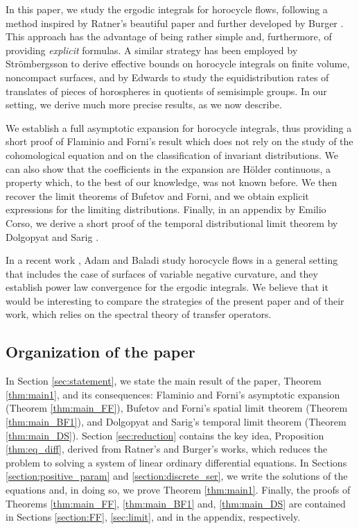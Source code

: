 \documentclass[10pt]{amsart}
\theoremstyle{definition}
\begin{document}
In this paper, we study the ergodic integrals for horocycle flows, following a method inspired by Ratner's beautiful paper \cite{Rat1} and further developed by Burger \cite{Bur}. This approach has the advantage of being rather simple and, furthermore, of providing \emph{explicit} formulas. A similar strategy has been employed by Strömbergsson \cite{Str} to derive effective bounds on horocycle integrals on finite volume, noncompact surfaces, and by Edwards \cite{Edw} to study the equidistribution rates of translates of pieces of horospheres in quotients of semisimple groups. In our setting, we derive much more precise results, as we now describe.\enlargethispage{\baselineskip}

We establish a full asymptotic expansion for horocycle integrals, thus providing a short proof of Flaminio and Forni's result which does not rely on the study of the cohomological equation and on the classification of invariant distributions.
We can also show that the coefficients in the expansion are Hölder continuous, a property which, to the best of our knowledge, was not known before.
We then recover the limit theorems of Bufetov and Forni, and we obtain explicit expressions for the limiting distributions.
Finally, in an appendix by Emilio Corso, we derive a short proof of the temporal distributional limit theorem by Dolgopyat and Sarig \cite{Dolgopyat-Sarig}.

In a recent work \cite{AdBa}, Adam and Baladi study horocycle flows in a general setting that includes the case of surfaces of variable negative curvature, and they establish power law convergence for the ergodic integrals. We believe that it would be interesting to compare the strategies of the present paper and of their work, which relies on the spectral theory of transfer operators.

\subsection{Organization of the paper}

In Section \ref{sec:statement}, we state the main result of the paper, Theorem \ref{thm:main1}, and its consequences: Flaminio and Forni's asymptotic expansion (Theorem \ref{thm:main_FF}), Bufetov and Forni's spatial limit theorem (Theorem \ref{thm:main_BF1}), and Dolgopyat and Sarig's temporal limit theorem (Theorem \ref{thm:main_DS}).
Section \ref{sec:reduction} contains the key idea, Proposition \ref{thm:eq_diff}, derived from Ratner's and Burger's works, which reduces the problem to solving a system of linear ordinary differential equations. In Sections \ref{section:positive_param} and \ref{section:discrete_ser}, we write the solutions of the equations and, in doing so, we prove Theorem \ref{thm:main1}. Finally, the proofs of Theorems \ref{thm:main_FF}, \ref{thm:main_BF1} and, \ref{thm:main_DS} are contained in Sections \ref{section:FF}, \ref{sec:limit}, and in the appendix, respectively.
\end{document}
